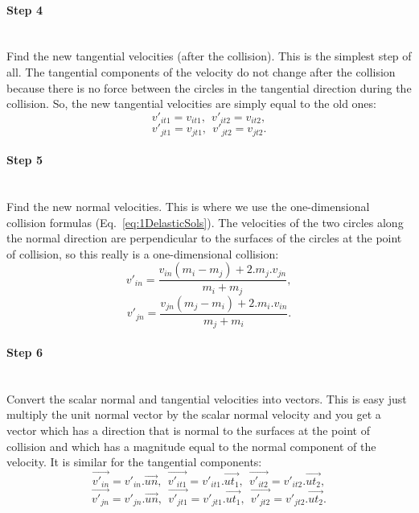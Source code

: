 \paragraph{Step 4}
~\\
Find the new tangential velocities (after the collision). 
This is the simplest step of all. 
The tangential components of the velocity do not change after the collision because there is no force between the circles in the tangential direction during the collision. 
So, the new tangential velocities are simply equal to the old ones:
\begin{equation*}
	v'_{it1} = v_{it1},~~v'_{it2} = v_{it2},
\end{equation*}
\begin{equation*}
	v'_{jt1} = v_{jt1},~~v'_{jt2} = v_{jt2}.
\end{equation*}

\paragraph{Step 5}
~\\
Find the new normal velocities. This is where we use the one-dimensional collision formulas (Eq.~\ref{eq:1DelasticSols}).
The velocities of the two circles along the normal direction are perpendicular to the surfaces
of the circles at the point of collision, so this really is a one-dimensional collision:
\begin{equation*}
	v'_{in} = \frac{v_{in}(m_i-m_j) + 2.m_j.v_{jn}}{m_i + m_j},
\end{equation*}
\begin{equation*}
	v'_{jn} = \frac{v_{jn}(m_j-m_i) + 2.m_i.v_{in}}{m_j + m_i}.
\end{equation*}

\paragraph{Step 6}
~\\
Convert the scalar normal and tangential velocities into vectors. 
This is easy just multiply the unit normal vector by the scalar normal velocity and you get a vector which has a direction that is normal to the surfaces at the point of collision and which has a magnitude equal to the normal component of the velocity. 
It is similar for the tangential components:
\begin{equation*}
	\vec{v'_{in}} = v'_{in} . \vec{un},~~\vec{v'_{it1}} = v'_{it1} . \vec{ut_1},~~\vec{v'_{it2}} = v'_{it2} . \vec{ut_2},
\end{equation*}
\begin{equation*}
	\vec{v'_{jn}} = v'_{jn} . \vec{un},~~\vec{v'_{jt1}} = v'_{jt1} . \vec{ut_1},~~\vec{v'_{jt2}} = v'_{jt2} . \vec{ut_2}.
\end{equation*}

